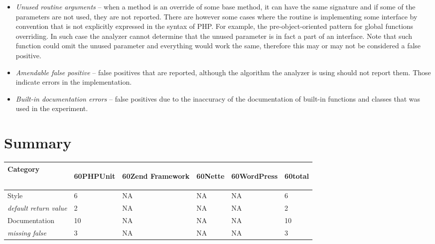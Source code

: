 \begin{itemize}
    \item[] \textit{Unused routine arguments} -- when a method is an override of 
        some base method, it can have the same signature and if some of the 
        parameters are not used, they are not reported. There are however 
        some cases where the routine is implementing some interface by convention 
        that is not explicitly expressed in the syntax of PHP.
        For example, the pre-object-oriented pattern for global functions 
        overriding. In such case the analyzer cannot determine that the unused 
        parameter is in fact a part of an interface. Note that such function 
        could omit the unused parameter and everything would work the same, 
        therefore this may or may not be considered a false positive.
    \item[] \textit{Amendable false positive} -- false positives 
        that are reported, although the algorithm the analyzer 
        is using should not report them. Those indicate errors 
        in the implementation.
    \item[] \textit{Built-in documentation errors} -- false positives 
        due to the inaccuracy of the documentation of built-in 
        functions and classes that was used in the experiment.
\end{itemize}

\section{Summary}

\newcommand{\subcat}[1]{\small{\textit{#1}}} 
\newcommand{\reldefret}{\subcat{default return value}}
\newcommand{\vturn}[1]{\begin{turn}{60}#1\end{turn}}

\begin{center}
    \begin{tabular}{| p{5cm} | l | l | l | l | l |}
    \hline
    Category                &   \vturn{PHPUnit}     &   \vturn{Zend Framework}      &   \vturn{Nette}   &   \vturn{WordPress}   &   \vturn{total}   \\ \hline
    Style                   &   6                   &       NA                      &   NA              &   NA                  &   6       \\ \hline
    \reldefret              &   2                   &       NA                      &   NA              &   NA                  &   2       \\ \hline        
    Documentation           &   10                  &       NA                      &   NA              &   NA                  &   10      \\ \hline    
    \subcat{missing false}  &   3                   &       NA                      &   NA              &   NA                  &   3      \\ \hline    
    \end{tabular}
\end{center}



